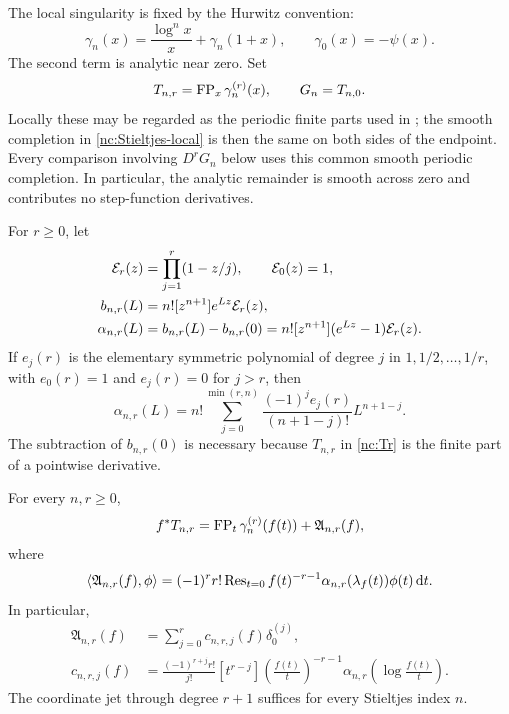 The local singularity is fixed by the Hurwitz convention:
\begin{equation}\label{nc:Stieltjes-local}
 \gamma_n(x)=\frac{\log^n x}{x}+\gamma_n(1+x),
 \qquad \gamma_0(x)=-\psi(x).
\end{equation}
The second term is analytic near zero. Set
\begin{equation}\label{nc:Tr}
 T_{n,r}=\operatorname{FP}_x\gamma_n^{(r)}(x),\qquad G_n=T_{n,0}.
\end{equation}
Locally these may be regarded as the periodic finite parts used in
\cite{incoming-md,incoming-sh}; the smooth completion in
\eqref{nc:Stieltjes-local} is then the same on both sides of the
endpoint. Every comparison involving $D^rG_n$ below uses this common
smooth periodic completion. In particular, the analytic remainder is
smooth across zero and contributes no step-function derivatives.

For $r\geq0$, let
\begin{align}
 \mathcal E_r(z)&=\prod_{j=1}^r(1-z/j),\qquad \mathcal E_0(z)=1,
       \label{nc:Er}\\
 b_{n,r}(L)&=n![z^{n+1}]e^{Lz}\mathcal E_r(z),\notag\\
 \alpha_{n,r}(L)&=b_{n,r}(L)-b_{n,r}(0)
       =n![z^{n+1}](e^{Lz}-1)\mathcal E_r(z).
       \label{nc:alpha}
\end{align}
If $e_j(r)$ is the elementary symmetric polynomial of degree $j$ in
$1,1/2,\ldots,1/r$, with $e_0(r)=1$ and $e_j(r)=0$ for $j>r$, then
\begin{equation}\label{nc:alpha-finite}
 \alpha_{n,r}(L)=n!\sum_{j=0}^{\min(r,n)}
      \frac{(-1)^je_j(r)}{(n+1-j)!}L^{n+1-j}.
\end{equation}
The subtraction of $b_{n,r}(0)$ is necessary because $T_{n,r}$ in
\eqref{nc:Tr} is the finite part of a pointwise derivative.

\begin{theorem}
\label{nc:Stieltjes}
For every $n,r\geq0$,
\begin{equation}\label{nc:Stieltjes-law}
 f^*T_{n,r}=\operatorname{FP}_t\gamma_n^{(r)}(f(t))+\mathfrak A_{n,r}(f),
\end{equation}
where
\begin{equation}\label{nc:Stieltjes-residue}
 \langle\mathfrak A_{n,r}(f),\phi\rangle
   =(-1)^rr!\operatorname{Res}_{t=0}
     f(t)^{-r-1}\alpha_{n,r}(\lambda_f(t))\phi(t)\,\mathrm d t.
\end{equation}
In particular,
\begin{align}
 \mathfrak A_{n,r}(f)&=\sum_{j=0}^r c_{n,r,j}(f)\delta_0^{(j)},
       \label{nc:finite-delta}\\
 c_{n,r,j}(f)&=\frac{(-1)^{r+j}r!}{j!}
   [t^{r-j}]\left(\frac{f(t)}t\right)^{-r-1}
       \alpha_{n,r}\!\left(\log\frac{f(t)}t\right).
       \label{nc:coefficient}
\end{align}
The coordinate jet through degree $r+1$ suffices for every Stieltjes
index $n$.
\end{theorem}

